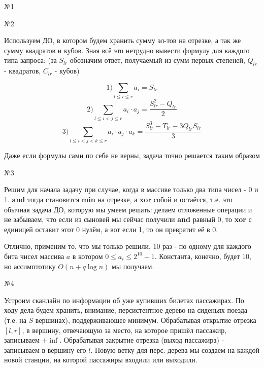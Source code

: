 \documentclass{article}
\begin{document}
\large

\begin{center}
\huge №1
\end{center}

\begin{center}
\huge №2
\end{center}

Используем ДО, в котором будем хранить сумму эл-тов на отрезке, а так же сумму квадратов и кубов. Зная всё это нетрудно вывести формулу для каждого типа запроса: (за $S_{lr}$ обозначим ответ, получаемый из сумм первых степеней, $Q_{lr}$ - квадратов, $C_{lr}$ - кубов)

$$ 1) \sum_{l \leq i \leq r} a_i =  S_{lr} $$
$$ 2) \sum_{l \leq i < j \leq r} a_i \cdot a_j =  \frac{S_{lr}^2 - Q_{lr}}{2} $$
$$ 3) \sum_{l \leq i < j < k \leq r} a_i \cdot a_j \cdot a_k =  \frac{S_{lr}^3 - T_{lr} - 3 Q_{lr}S_{lr}}{3} $$

Даже если формулы сами по себе не верны, задача точно решается таким образом

\begin{center}
\huge №3
\end{center}

Решим для начала задачу при случае, когда в массиве только два типа чисел - 0 и 1. \textbf{and} тогда становится \textbf{min} на отрезке, а \textbf{xor} собой и остаётся, т.е. это обычная задача ДО, которую мы умеем решать: делаем отложенные операции и не забываем, что если из сыновей мы сейчас получили \textbf{and} равный 0, то \textbf{xor} с единицей оставит этот 0 нулём, а вот если 1, то он превратит её в 0.

Отлично, применим то, что мы только решили, 10 раз - по одному для каждого бита чисел массива $a$ в котором $0 \leq a_i \leq 2^{10}-1$. Константа, конечно, будет 10, но ассимптотику $O(n + q \log n)$ мы получаем.

\begin{center}
\huge №4
\end{center}

Устроим сканлайн по информации об уже купивших билетах пассажирах. По ходу дела будем хранить, внимание, персистентное дерево на сиденьях поезда (т.е. на $S$ вершинах), поддерживающее минимум. Обрабатывая открытие отрезка $[l, r]$, в вершину, отвечающую за место, на которое пришёл пассажир, записываем $+\inf$. Обрабатывая закрытие отрезка (выход пассажира) - записываем в вершину его $l$. Новую ветку для перс. дерева мы создаем на каждой новой станции, на которой пассажиры входили или выходили.
\end{document}

